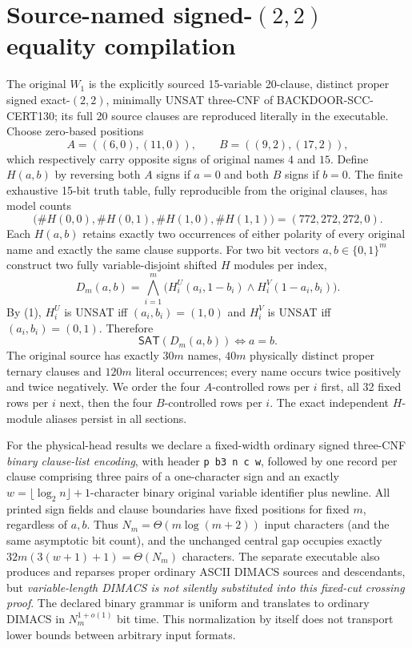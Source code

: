 \documentclass[11pt]{article}
\newcommand{\SAT}{\mathsf{SAT}}
\begin{document}
\section{Source-named signed-$(2,2)$ equality compilation}
The original $W_1$ is the explicitly sourced 15-variable 20-clause, distinct proper signed exact-$(2,2)$, minimally UNSAT three-CNF of BACKDOOR-SCC-CERT130; its full 20 source clauses are reproduced literally in the executable. Choose zero-based positions
\[
 A=((6,0),(11,0)),\qquad B=((9,2),(17,2)),
\]
which respectively carry opposite signs of original names $4$ and $15$. Define $H(a,b)$ by reversing both $A$ signs if $a=0$ and both $B$ signs if $b=0$. The finite exhaustive 15-bit truth table, fully reproducible from the original clauses, has model counts
\[
\bigl(\#H(0,0),\#H(0,1),\#H(1,0),\#H(1,1)\bigr)=(772,272,272,0).
\tag{1}
\]
Each $H(a,b)$ retains exactly two occurrences of either polarity of every original name and exactly the same clause supports. For two bit vectors $a,b\in\{0,1\}^m$ construct two fully variable-disjoint shifted $H$ modules per index,
\[
 D_m(a,b)=\bigwedge_{i=1}^{m}\bigl(H_i^U(a_i,1-b_i)\wedge H_i^V(1-a_i,b_i)\bigr).
\tag{2}
\]
By (1), $H_i^U$ is UNSAT iff $(a_i,b_i)=(1,0)$ and $H_i^V$ is UNSAT iff $(a_i,b_i)=(0,1)$. Therefore
\[
 \boxed{\SAT(D_m(a,b))\iff a=b.}\tag{3}
\]
The original source has exactly $30m$ names, $40m$ physically distinct proper ternary clauses and $120m$ literal occurrences; every name occurs twice positively and twice negatively. We order the four $A$-controlled rows per $i$ first, all 32 fixed rows per $i$ next, then the four $B$-controlled rows per $i$. The exact independent $H$-module aliases persist in all sections.

For the physical-head results we declare a fixed-width ordinary signed three-CNF \emph{binary clause-list encoding}, with header \texttt{p b3 n c w}, followed by one record per clause comprising three pairs of a one-character sign and an exactly $w=\lfloor\log_2 n\rfloor+1$-character binary original variable identifier plus newline. All printed sign fields and clause boundaries have fixed positions for fixed $m$, regardless of $a,b$. Thus $N_m=\Theta(m\log(m+2))$ input characters (and the same asymptotic bit count), and the unchanged central gap occupies exactly $32m(3(w+1)+1)=\Theta(N_m)$ characters. The separate executable also produces and reparses proper ordinary ASCII DIMACS sources and descendants, but \emph{variable-length DIMACS is not silently substituted into this fixed-cut crossing proof}. The declared binary grammar is uniform and translates to ordinary DIMACS in $N_m^{1+o(1)}$ bit time. This normalization by itself does not transport lower bounds between arbitrary input formats.
\end{document}
